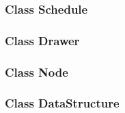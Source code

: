 \documentclass[11pt]{article}
\begin{document}
\subsubsection{Class Schedule}
\label{sec-1_3_5}
\label{c630bcdb-1a8c-42e0-be7d-00b291478083}
\subsubsection{Class Drawer}
\label{sec-1_3_6}
\label{72f6c28a-d103-4462-888e-297d49d0122e}
\subsubsection{Class Node}
\label{sec-1_3_7}
\label{3b4ae05e-be52-4854-a638-ecc8d2480512}
\subsubsection{Class DataStructure}
\label{sec-1_3_8}
\label{123f19bd-309b-4bda-91de-9c1ca202fac4}
\end{document}
